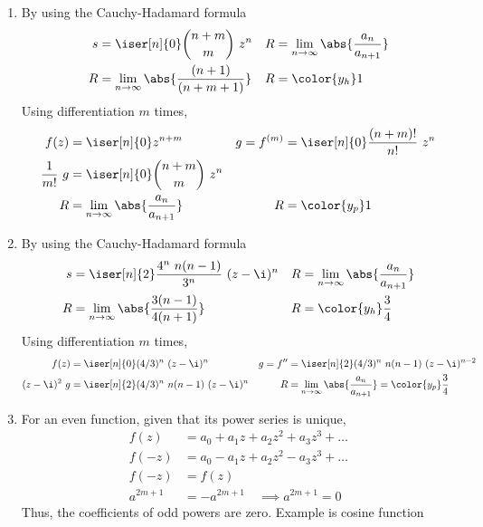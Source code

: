 \begin{enumerate}
    \item By using the Cauchy-Hadamard formula
          \begin{align}
              s          & = \iser[n]{0} \binom{n+m}{m}\ z^{n}     &
              R          & = \lim_{n \to \infty} \abs{\frac{a_n}
              {a_{n+1}}}                                             \\
              R          & = \lim_{n \to \infty} \abs{\frac{(n+1)}
              {(n+m+1)}} &
              R          & = \color{y_h} 1
          \end{align}
          Using differentiation $m$ times,
          \begin{align}
              f(z)            & = \iser[n]{0} z^{n+m}                           &
              g = f^{(m)}     & = \iser[n]{0} \frac{(n+m)!}{n!}\ z^{n}            \\
              \frac{1}{m!}\ g & = \iser[n]{0} \binom{n+m}{m}\ z^{n}               \\
              R               & = \lim_{n \to \infty} \abs{\frac{a_n}{a_{n+1}}} &
              R               & = \color{y_p} 1
          \end{align}

    \item By using the Cauchy-Hadamard formula
          \begin{align}
              s         & = \iser[n]{2} \frac{4^n\ n(n-1)}{3^n}\ (z - \i)^{n} &
              R         & = \lim_{n \to \infty} \abs{\frac{a_n}
              {a_{n+1}}}                                                        \\
              R         & = \lim_{n \to \infty} \abs{\frac{3(n-1)}
              {4(n+1)}} &
              R         & = \color{y_h} \frac{3}{4}
          \end{align}
          Using differentiation $m$ times,
          \begin{align}
              f(z)        & = \iser[n]{0} (4/3)^n\ (z - \i)^{n}             &
              g = f''     & = \iser[n]{2} (4/3)^n\ n(n-1)\ (z - \i)^{n-2}     \\
              (z-\i)^2\ g & = \iser[n]{2} (4/3)^n\ n(n-1)\ (z - \i)^{n}     &
              R           & = \lim_{n \to \infty} \abs{\frac{a_n}{a_{n+1}}}
              = \color{y_p} \frac{3}{4}
          \end{align}

    \item For an even function, given that its power series is unique,
          \begin{align}
              f(z)     & = a_0 + a_1 z + a_2 z^2 + a_3 z^3 + \dots \\
              f(-z)    & = a_0 - a_1 z + a_2 z^2 - a_3 z^3 + \dots \\
              f(-z)    & = f(z)                                    \\
              a^{2m+1} & = -a^{2m+1} \quad \implies a^{2m+1} = 0
          \end{align}
          Thus, the coefficients of odd powers are zero. Example is cosine function


\end{enumerate}
